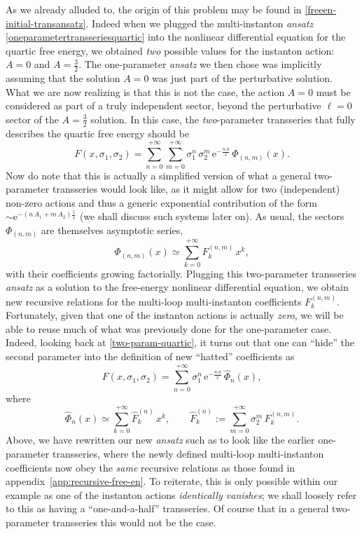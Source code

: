\documentclass[11pt,a4paper]{article}
\newcommand{\be}{\begin{equation}}
\newcommand{\ee}{\end{equation}}
\newcommand{\rme}{{\mathrm{e}}}
\begin{document}
As we already alluded to, the origin of this problem may be found in \eqref{freeen-initial-transansatz}. Indeed when we plugged the multi-instanton \textit{ansatz} \eqref{oneparametertransseriesquartic} into the nonlinear differential equation for the quartic free energy, we obtained \textit{two} possible values for the instanton action: $A=0$ and $A=\frac{3}{2}$. The one-parameter \textit{ansatz} we then chose was implicitly assuming that the solution $A=0$ was just part of the perturbative solution. What we are now realizing is that this is not the case, the action $A=0$ must be considered as part of a truly independent sector, beyond the perturbative $\ell=0$ sector of the $A = \frac{3}{2}$ solution. In this case, the \textit{two}-parameter transseries that fully describes the quartic free energy should be
%
\be
\label{two-param-quartic}
F (x, \sigma_1, \sigma_2) = \sum_{n=0}^{+\infty} \sum_{m=0}^{+\infty} \sigma_1^n\, \sigma_2^m\, \rme^{-\frac{n A}{x}}\, \Phi_{(n,m)} (x).
\ee
%
\noindent
Now do note that this is actually a simplified version of what a general two-parameter transseries would look like, as it might allow for two (independent) non-zero actions and thus a generic exponential contribution of the form $\sim \rme^{- \left( n\, A_1 + m\, A_2 \right) \frac{1}{x}}$ (we shall discuss such systems later on). As usual, the sectors $\Phi_{(n,m)}$ are themselves asymptotic series,
%
\be
\label{two-param-sectors-quartic}
\Phi_{(n,m)} (x) \simeq \sum_{k=0}^{+\infty} F_{k}^{(n,m)}\, x^{k},
\ee
%
\noindent
with their coefficients growing factorially. Plugging this two-parameter transseries \textit{ansatz} as a solution to the free-energy nonlinear differential equation, we obtain new recursive relations for the multi-loop multi-instanton coefficients $F_{k}^{(n,m)}$. Fortunately, given that one of the instanton actions is actually \textit{zero}, we will be able to reuse much of what was previously done for the one-parameter case. Indeed, looking back at \eqref{two-param-quartic}, it turns out that one can ``hide'' the second parameter into the definition of new ``hatted'' coefficients as
%
\be
\label{two-into-one-param-quartic}
F (x, \sigma_1, \sigma_2) = \sum_{n=0}^{+\infty} \sigma_1^n\, \rme^{-\frac{n A}{x}}\, \widehat{\Phi}_{n} (x),
\ee
%
\noindent
where
%
\be
\label{two-into-one-param-sectors-quartic}
\widehat{\Phi}_{n}(x) \simeq \sum_{k=0}^{+\infty} \widehat{F}_{k}^{(n)}\, x^{k}, \qquad\widehat{F}_{k}^{(n)} := \sum_{m=0}^{+\infty} \sigma_2^m\, F_{k}^{(n,m)}.
\ee
%
\noindent
Above, we have rewritten our new \textit{ansatz} such as to look like the earlier one-parameter transseries, where the newly defined multi-loop multi-instanton coefficients now obey the \textit{same} recursive relations as those found in appendix~\ref{app:recursive-free-en}. To reiterate, this is only possible within our example as one of the instanton actions \textit{identically vanishes}; we shall loosely refer to this as having a ``one-and-a-half'' transseries. Of course that in a general two-parameter transseries this would not be the case.
\end{document}
